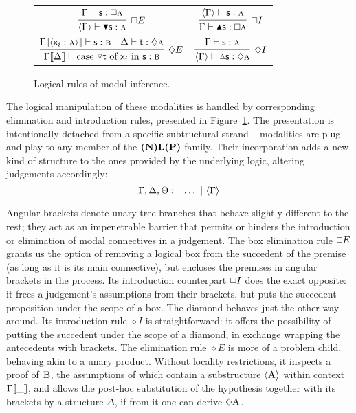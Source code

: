 \begin{figure}
	\centering
	\begin{tabularx}{0.9875\textwidth}{@{}CC@{}}
		$\infer[\bx E]{\bracket{\Gamma} \vdash \boxelim{\term{s}}: \prop{a}}{
			\Gamma \vdash \term{s}: \bx\prop{a}
		}$
		&
		$\infer[\bx I]{\Gamma \vdash \boxintro{\term{s}}:\bx\prop{a}}{
			\bracket{\Gamma} \vdash \term{s}:\prop{a}
		}$
		\\[\smallsep]
		$\infer[\diamond E]{\Gamma\ctx{\Delta} \vdash \cterm{case \term{\diaelim t} of \term{\vari } in \term{s}}: \prop{b}}{
			\Gamma\ctx{\bracket{\term{\vari }:\prop{a}}}\vdash\term{s}:\prop{b}
			&
			\Delta \vdash \term{t}:\diamond\prop{a}
		}
		$
		&
		$\infer[\diamond I]{\bracket{\Gamma} \vdash \diaintro{\term{s}}: \diamond \prop{a}}{
			\Gamma \vdash \term{s}:\prop{a}
		}$
	\end{tabularx}
	\caption{Logical rules of modal inference.}
	\label{figure:modal_logical}
\end{figure}

The logical manipulation of these modalities is handled by corresponding elimination and introduction rules, presented in Figure~\ref{figure:modal_logical}.
The presentation is intentionally detached from a specific subtructural strand -- modalities are plug-and-play to any member of the $\textbf{(N)L(P)}$ family.
Their incorporation adds a new kind of structure to the ones provided by the underlying logic, altering judgements accordingly:
\begin{equation}
	\Gamma, \Delta, \Theta := \dots \ | \ \bracket{\Gamma}
\end{equation}

Angular brackets denote unary tree branches that behave slightly different to the rest; they act as an impenetrable barrier that permits or hinders the introduction or elimination of modal connectives in a judgement.
The box elimination rule $\bx E$ grants us the option of removing a logical box from the succedent of the premise (as long as it is its main connective), but encloses the premises in angular brackets in the process.
Its introduction counterpart $\bx I$ does the exact opposite: it frees a judgement's assumptions from their brackets, but puts the succedent proposition under the scope of a box.
The diamond behaves just the other way around.
Its introduction rule $\diamond I$ is straightforward: it offers the possibility of putting the succedent under the scope of a diamond, in exchange wrapping the antecedents with brackets.
The elimination rule $\diamond E$ is more of a problem child, behaving akin to a unary product.
Without locality restrictions, it inspects a proof of $\normalfont\textsc{B}$, the assumptions of which contain a substructure $\langle{ \ensuremath{\normalfont\textsc{A}}}\rangle$ within context $\Gamma{\llbracket{\_}\rrbracket}$, and allows the post-hoc substitution of the hypothesis together with its brackets by a structure $\Delta$, if from it one can derive $\diamond \smallprop{A}$.

